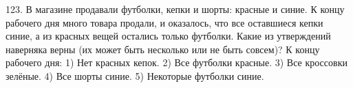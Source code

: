 123. В магазине продавали футболки, кепки и шорты: красные и синие. К концу рабочего дня много товара продали, и оказалось, что все оставшиеся кепки синие, а из красных вещей остались только футболки. Какие из утверждений наверняка верны (их может быть несколько или не быть совсем)? К концу рабочего дня: 1) Нет красных кепок. 2) Все футболки красные. 3) Все кроссовки зелёные. 4) Все шорты синие. 5) Некоторые футболки синие.\\
